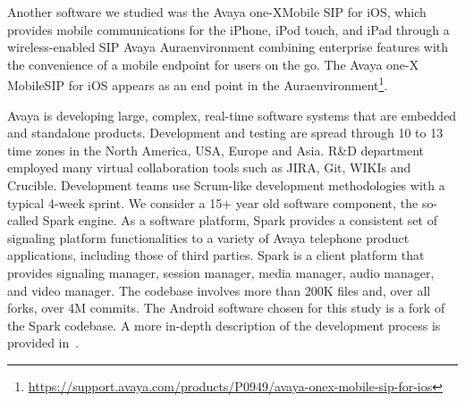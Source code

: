 \documentclass[smallextended]{svjour3}       %
\begin{document}
Another software we studied was the Avaya one-X\textregistered Mobile  SIP for  iOS, which provides mobile communications for the iPhone, iPod touch, and iPad through a wireless-enabled SIP Avaya Aura\textregistered environment combining enterprise features with the convenience of a mobile endpoint for users on the go. The Avaya one-X Mobile\textregistered SIP for iOS appears as an end point in the Aura\textregistered environment\footnote{\url{https://support.avaya.com/products/P0949/avaya-onex-mobile-sip-for-ios}}.

Avaya is developing large, complex, real-time software systems that
are embedded and standalone products. Development and testing are
spread through 10 to 13 time zones in the North America, USA, Europe
and Asia. R\&D department employed many virtual collaboration tools
such as JIRA, Git, WIKIs and Crucible. Development teams use
Scrum-like development methodologies with a typical 4-week
sprint. We consider a 15+ year old software component, the so-called
Spark engine.  As a software platform, Spark provides a consistent
set of signaling platform functionalities to a variety of Avaya
telephone product applications, including those of third parties.
Spark is a client platform that provides signaling manager, session
manager, media manager, audio manager, and video manager. The
codebase involves more than 200K files and, over all forks, over 4M
commits.  The Android software chosen for this study is a fork of
the Spark codebase. A more in-depth description of the development
process is provided in~\cite{amhp14}.
\end{document}
